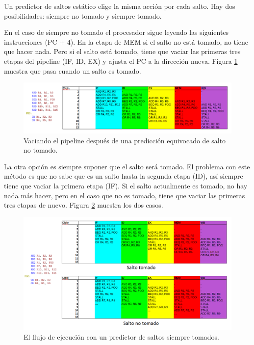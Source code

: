 \documentclass[a4paper]{article}
\begin{document}
Un predictor de saltos estático elige la misma acción por cada salto. Hay dos posibilidades: siempre no tomado y siempre tomado.

En el caso de siempre no tomado el procesador sigue leyendo las siguientes instrucciones (PC + 4). En la etapa de MEM si el salto no está tomado, no tiene que hacer nada. Pero si el salto está tomado, tiene que vaciar las primeras tres etapas del pipeline (IF, ID, EX) y ajusta el PC a la dirección nueva. Figura \ref{fig:assume_not_taken_wrong} muestra que pasa cuando un salto es tomado.

\begin{figure}[!htb]
\centering
\includegraphics[scale=0.4]{./img/assume_not_taken_wrong}
\caption{Vaciando el pipeline después de una predicción equivocado de salto no tomado.}
\label{fig:assume_not_taken_wrong}
\end{figure}

La otra opción es siempre suponer que el salto será tomado. El problema con este método es que no sabe que es un salto hasta la segunda etapa (ID), así siempre tiene que vaciar la primera etapa (IF). Si el salto actualmente es tomado, no hay nada más hacer, pero en el caso que no es tomado, tiene que vaciar las primeras tres etapas de nuevo. Figura \ref{fig:assume_taken} muestra los dos casos.

\begin{figure}[!htb]
\centering
\includegraphics[scale=0.4]{./img/assume_taken}
\caption{El flujo de ejecución con un predictor de saltos siempre tomados.}
\label{fig:assume_taken}
\end{figure}
\end{document}
